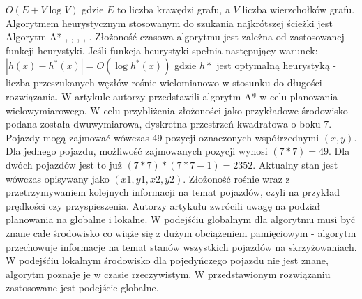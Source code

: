 \newline
\newline
\begin{math}
O(E + V\log V)
\end{math}
\newline
\newline
gdzie \begin{math}E\end{math} to liczba krawędzi grafu, a \begin{math}V\end{math} liczba wierzchołków grafu.
\indent
\newline
\newline
\indent
  Algorytmem heurystycznym stosowanym do szukania najkrótszej ścieżki jest Algorytm A* \cite{munteanmobile}, \cite{oleiwi2014modified}, \cite{wojnicki2015robust}, \cite{elhalawany2013modified}, \cite{dechter1985generalized}. Złożoność czasowa algorytmu jest zależna od zastosowanej funkcji heurystyki. Jeśli funkcja heurystyki spełnia następujący warunek:
\newline
\newline
\begin{math}
|h(x)-h^{*}(x)|=O(\log h^{*}(x))
\end{math}
\newline
\newline
gdzie \begin{math}h*\end{math} jest optymalną heurystyką - liczba przeszukanych węzłów rośnie wielomianowo w stosunku do długości rozwiązania.
\newline
\indent
W artykule \cite{wojnicki2015robust} autorzy przedstawili algorytm A* w celu planowania wielowymiarowego. W celu przybliżenia złożoności jako przykładowe środowisko podana została dwuwymiarowa, dyskretna przestrzeń kwadratowa o boku 7. Pojazdy mogą zajmować wówczas 49 pozycji oznaczonych współrzednymi \begin{math}(x, y)\end{math}. Dla jednego pojazdu, możliwość zajmowanych pozycji wynosi \begin{math}(7 * 7) = 49 \end{math}. Dla dwóch pojazdów jest to już \begin{math}(7 * 7) * (7 * 7 - 1) = 2352 \end{math}. Aktualny stan jest wówczas opisywany jako \begin{math}(x1, y1, x2, y2)\end{math}. Złożoność rośnie wraz z przetrzymywaniem kolejnych informacji na temat pojazdów, czyli  na przykład prędkości czy przyspieszenia.
\newline
\indent
Autorzy artykułu \cite{leena2014survey} zwrócili uwagę na podział planowania na globalne i lokalne. W podejśćiu globalnym dla algorytmu musi być znane całe środowisko co wiąże się z dużym obciążeniem pamięciowym - algorytm przechowuje informacje na temat stanów wszystkich pojazdów na skrzyżowaniach. W podejśćiu lokalnym środowisko dla pojedyńczego pojazdu nie jest znane, algorytm poznaje je w czasie rzeczywistym. W przedstawionym rozwiązaniu zastosowane jest podejście globalne.

